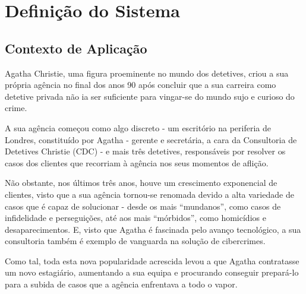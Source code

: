 \documentclass[a4paper,12pt]{scrreprt}
\begin{document}
\pagebreak

\listoffigures

\pagebreak

\listoftables

\pagebreak




\chapter{Definição do Sistema}
    \section{Contexto de Aplicação}
    Agatha Christie, uma figura proeminente no mundo dos detetives, criou a sua própria agência
    no final dos anos 90 após concluir que a sua carreira como detetive privada não ia ser
    suficiente para vingar-se do mundo sujo e curioso do crime.

    A sua agência começou como algo discreto - um escritório na periferia de Londres,
    constituído por Agatha - gerente e secretária, a cara da Consultoria de Detetives Christie
    (CDC) - e mais três detetives, responsáveis por resolver os casos dos clientes que recorriam
    à agência nos seus momentos de aflição.
    
    Não obstante, nos últimos três anos, houve um crescimento exponencial de clientes, visto que a
    sua agência tornou-se renomada devido a alta variedade de casos que é capaz de solucionar -
    desde os mais “mundanos”, como casos de infidelidade e perseguições, até aos mais
    “mórbidos”, como homicídios e desaparecimentos. E, visto que Agatha é fascinada pelo avanço
    tecnológico, a sua consultoria também é exemplo de vanguarda na solução de cibercrimes.
    
    Como tal, toda esta nova popularidade acrescida levou a que Agatha contratasse um novo
    estagiário, aumentando a sua equipa e procurando conseguir prepará-lo para a subida de
    casos que a agência enfrentava a todo o vapor.
\end{document}
